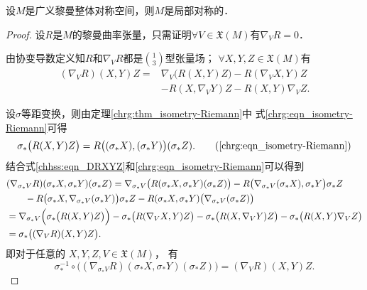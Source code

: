 \begin{theorem}
    设$M$是广义黎曼整体对称空间，则$M$是局部对称的．
\end{theorem}
\begin{proof}
设$R$是$M$的黎曼曲率张量，只需证明$\forall V\in \mathfrak{X}(M)$有$\nabla_V R=0$．

由协变导数定义知$R$和$\nabla_V R$都是$\binom{1}{3}$型张量场；
$\forall X, Y, Z \in \mathfrak{X}(M)$有
\begin{equation}\label{chhss:eqn_DRXYZ}
    \begin{aligned}
             (\nabla_V R)(X, Y) Z = &\nabla_V\bigl(R(X, Y) Z\bigr)  
        - R(\nabla_V X, Y) Z \\
        &- R (X, \nabla_V Y)Z- R (X, Y) \nabla_V Z   .
    \end{aligned}
\end{equation} %

设$\sigma$等距变换，则由定理\ref{chrg:thm_isometry-Riemann}中
式\eqref{chrg:eqn_isometry-Riemann}可得
\begin{equation}
    \sigma_{*}\bigl(R (X, Y) Z\bigr) = R \bigl((\sigma_{*} X), (\sigma_{*} Y)\bigr) 
     (\sigma_{*} Z) . \tag{\ref{chrg:eqn_isometry-Riemann}}
\end{equation}
结合式\eqref{chhss:eqn_DRXYZ}和\eqref{chrg:eqn_isometry-Riemann}可以得到
\setlength{\mathindent}{0em}
\begin{align*}
    & (\nabla_{\sigma_* V} R)(\sigma_* X, \sigma_* Y)(\sigma_* Z) 
     =\nabla_{\sigma_* V}\bigl(R (\sigma_* X, \sigma_* Y)(\sigma_*Z )\bigr) 
      -R\bigl(\nabla_{\sigma_* V} (\sigma_* X), \sigma_* Y\bigr) \sigma_* Z \\ 
    &\qquad -R\bigl(\sigma_* X, \nabla_{\sigma_*V}(\sigma_* Y)\bigr)\sigma_* Z
      -R(\sigma_* X, \sigma_* Y)\bigl(\nabla_{\sigma_* V }(\sigma_* Z)\bigr) \\
    & =\nabla_{\sigma_* V}\Bigl(\sigma_*\bigl(R(X, Y) Z\bigr)\Bigr) 
      -\sigma_* \bigl(R(\nabla_V X, Y) Z\bigr) 
      -\sigma_* \bigl(R(X, \nabla_V Y) Z\bigr)-\sigma_*\bigl(R(X, Y)\nabla_V Z\bigr) \\
    & =\sigma_* \bigl((\nabla_V R)(X, Y) Z\bigr) . 
\end{align*}\setlength{\mathindent}{2em}
即对于任意的 $X, Y, Z, V \in \mathfrak{X}(M)$， 有
\begin{equation}\label{chhss:eqn_sDR}
  \sigma_*^{-1} \circ\bigl((\nabla_{\sigma_*V } R)(\sigma_* X, \sigma_* Y)(\sigma_* Z) \bigr)
  =(\nabla_V R)(X, Y) Z .
\end{equation}


\end{proof}
